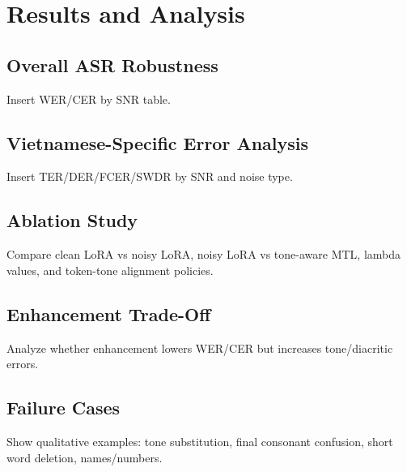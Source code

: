 \section{Results and Analysis}
\subsection{Overall ASR Robustness}
Insert WER/CER by SNR table.

\subsection{Vietnamese-Specific Error Analysis}
Insert TER/DER/FCER/SWDR by SNR and noise type.

\subsection{Ablation Study}
Compare clean LoRA vs noisy LoRA, noisy LoRA vs tone-aware MTL, lambda values, and token-tone alignment policies.

\subsection{Enhancement Trade-Off}
Analyze whether enhancement lowers WER/CER but increases tone/diacritic errors.

\subsection{Failure Cases}
Show qualitative examples: tone substitution, final consonant confusion, short word deletion, names/numbers.
